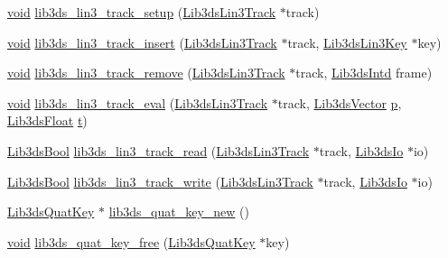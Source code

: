 \begin{DoxyCompactItemize}
\item 
\hyperlink{group___u_a_v_objects_plugin_ga444cf2ff3f0ecbe028adce838d373f5c}{void} \hyperlink{group__tracks_ga7babfe23d4a49bfb875d678bab3d3aa4}{lib3ds\-\_\-lin3\-\_\-track\-\_\-setup} (\hyperlink{struct_lib3ds_lin3_track}{Lib3ds\-Lin3\-Track} $\ast$track)
\item 
\hyperlink{group___u_a_v_objects_plugin_ga444cf2ff3f0ecbe028adce838d373f5c}{void} \hyperlink{group__tracks_ga67da574ae7749d1c08f5a0413ae8f16f}{lib3ds\-\_\-lin3\-\_\-track\-\_\-insert} (\hyperlink{struct_lib3ds_lin3_track}{Lib3ds\-Lin3\-Track} $\ast$track, \hyperlink{struct_lib3ds_lin3_key}{Lib3ds\-Lin3\-Key} $\ast$key)
\item 
\hyperlink{group___u_a_v_objects_plugin_ga444cf2ff3f0ecbe028adce838d373f5c}{void} \hyperlink{group__tracks_ga02e6b624d2a85653b66adb3f70262b4b}{lib3ds\-\_\-lin3\-\_\-track\-\_\-remove} (\hyperlink{struct_lib3ds_lin3_track}{Lib3ds\-Lin3\-Track} $\ast$track, \hyperlink{types_8h_a5d92ad41149cf040ce2ee32cc2609403}{Lib3ds\-Intd} frame)
\item 
\hyperlink{group___u_a_v_objects_plugin_ga444cf2ff3f0ecbe028adce838d373f5c}{void} \hyperlink{group__tracks_gabacc6b8f7d09c36a4038b08ddd3b4a51}{lib3ds\-\_\-lin3\-\_\-track\-\_\-eval} (\hyperlink{struct_lib3ds_lin3_track}{Lib3ds\-Lin3\-Track} $\ast$track, \hyperlink{group__vector_ga6ac1c3b3ef15381ebf6baf264d658dcf}{Lib3ds\-Vector} \hyperlink{glext_8h_aa5367c14d90f462230c2611b81b41d23}{p}, \hyperlink{types_8h_ab18e70f51f9a53c9dee8d930c8e1a7bf}{Lib3ds\-Float} \hyperlink{glext_8h_a00140d6f5c548b26daf170bf16e86a6d}{t})
\item 
\hyperlink{types_8h_a89dd7398a9ebbbf28011f8c32df67ad3}{Lib3ds\-Bool} \hyperlink{group__tracks_ga7a27e05d9efc95437e492166eec0458c}{lib3ds\-\_\-lin3\-\_\-track\-\_\-read} (\hyperlink{struct_lib3ds_lin3_track}{Lib3ds\-Lin3\-Track} $\ast$track, \hyperlink{struct_lib3ds_io}{Lib3ds\-Io} $\ast$io)
\item 
\hyperlink{types_8h_a89dd7398a9ebbbf28011f8c32df67ad3}{Lib3ds\-Bool} \hyperlink{group__tracks_ga8af9640de144fb749095f10ae3b75205}{lib3ds\-\_\-lin3\-\_\-track\-\_\-write} (\hyperlink{struct_lib3ds_lin3_track}{Lib3ds\-Lin3\-Track} $\ast$track, \hyperlink{struct_lib3ds_io}{Lib3ds\-Io} $\ast$io)
\item 
\hyperlink{struct_lib3ds_quat_key}{Lib3ds\-Quat\-Key} $\ast$ \hyperlink{group__tracks_ga6654d4a21a4c2558ce0f5486239ab381}{lib3ds\-\_\-quat\-\_\-key\-\_\-new} ()
\item 
\hyperlink{group___u_a_v_objects_plugin_ga444cf2ff3f0ecbe028adce838d373f5c}{void} \hyperlink{group__tracks_ga63281dae1eda63a93b0c7b2dcf72f361}{lib3ds\-\_\-quat\-\_\-key\-\_\-free} (\hyperlink{struct_lib3ds_quat_key}{Lib3ds\-Quat\-Key} $\ast$key)

\end{DoxyCompactItemize}
